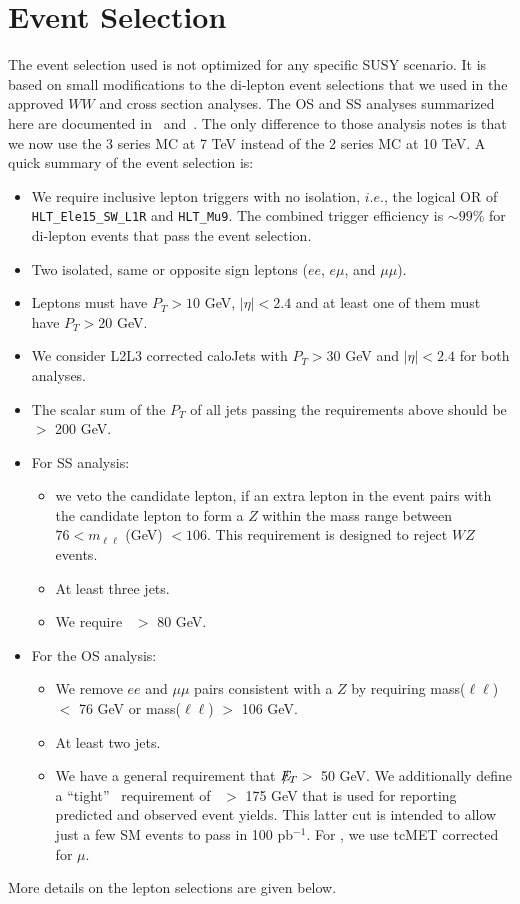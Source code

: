 \section{Event Selection}
\label{sec:eventselection}

The event selection used is not optimized for any specific SUSY
scenario. It is based on small modifications to the di-lepton event
selections  that we used in the approved $WW$\cite{ww} and
\ttbar\cite{ttbar} cross section analyses.  The OS and SS analyses
summarized here are documented in~\cite{osnote} and~\cite{ssnote}. The
only difference to those analysis notes is that we now use the 3
series MC at 7 TeV instead of the 2 series MC at 10 TeV.  
A quick summary of the event selection is:

\begin{itemize}
\item We require inclusive lepton triggers with no isolation, $i.e.$, the
  logical OR of {\tt HLT\_Ele15\_SW\_L1R} and {\tt HLT\_Mu9}. 
  The combined trigger efficiency is $\sim 99$\% for di-lepton events that pass the event selection.
\item Two isolated, same or opposite sign leptons ($ee$, $e\mu$, and $\mu\mu$). 
\item Leptons must have $P_T > 10$ GeV, $|\eta|< 2.4$ and at least one of them must have $P_T > 20$ GeV.
\item We consider L2L3 corrected caloJets with $P_T > 30$ GeV and
	$|\eta|< 2.4$ for both analyses. 
\item The scalar sum of the $P_T$ of all jets passing the requirements above should be $>$ 200 GeV.
\item For SS analysis:
\begin{itemize}
      \item  we veto the candidate lepton, if an extra lepton in the event pairs with the candidate lepton
             to form a $Z$ within the mass range between $76 < m_{\ell\ell} $ (GeV) $< 106$. This requirement is 
             designed to reject $WZ$ events.
      \item At least three jets.
      \item We require \met~$>$ 80 GeV.
\end{itemize}
\item For the OS analysis: 
\begin{itemize}
      \item We remove $ee$ and $\mu\mu$ pairs consistent with a $Z$ by requiring mass($\ell\ell$) $<$ 76 GeV or mass($\ell\ell$) $>$ 106 GeV.
      \item At least two jets.
      \item We have a general requirement that $E\!\!\!\!/_T>$~50 GeV. We additionally define a ``tight'' \met~requirement of \met~$>$ 175 GeV
	that is used for reporting predicted and observed event yields.
	This latter cut is intended to allow just a few SM events to
	pass in 100 pb$^{-1}$.  For \met, we use tcMET \cite{tcmet}
	corrected for $\mu$.
\end{itemize}
\end{itemize}
\noindent More details on the lepton %
selections are given below.

